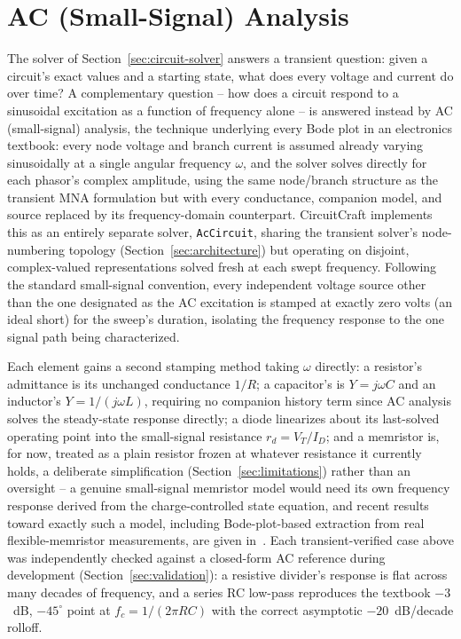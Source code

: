 \section{AC (Small-Signal) Analysis}
\label{sec:ac-analysis}

The solver of Section~\ref{sec:circuit-solver} answers a transient question: given a
circuit's exact values and a starting state, what does every voltage and current do over
time? A complementary question -- how does a circuit respond to a sinusoidal excitation as a
function of frequency alone -- is answered instead by AC (small-signal) analysis, the
technique underlying every Bode plot in an electronics textbook: every node voltage and
branch current is assumed already varying sinusoidally at a single angular frequency
$\omega$, and the solver solves directly for each phasor's complex amplitude, using the same
node/branch structure as the transient MNA formulation but with every conductance,
companion model, and source replaced by its frequency-domain counterpart. CircuitCraft
implements this as an entirely separate solver, \texttt{AcCircuit}, sharing the transient
solver's node-numbering topology (Section~\ref{sec:architecture}) but operating on disjoint,
complex-valued representations solved fresh at each swept frequency. Following the standard
small-signal convention, every independent voltage source other than the one designated as
the AC excitation is stamped at exactly zero volts (an ideal short) for the sweep's duration,
isolating the frequency response to the one signal path being characterized.

Each element gains a second stamping method taking $\omega$ directly: a resistor's admittance
is its unchanged conductance $1/R$; a capacitor's is $Y=j\omega C$ and an inductor's
$Y=1/(j\omega L)$, requiring no companion history term since AC analysis solves the
steady-state response directly; a diode linearizes about its last-solved operating point into
the small-signal resistance $r_d=V_T/I_D$; and a memristor is, for now, treated as a plain
resistor frozen at whatever resistance it currently holds, a deliberate simplification
(Section~\ref{sec:limitations}) rather than an oversight -- a genuine small-signal memristor
model would need its own frequency response derived from the charge-controlled state
equation, and recent results toward exactly such a model, including Bode-plot-based
extraction from real flexible-memristor measurements, are given
in~\cite{gater2026smallsignal,gater2025bodeplots}. Each transient-verified case above was
independently checked against a closed-form AC reference during development
(Section~\ref{sec:validation}): a resistive divider's response is flat across many decades of
frequency, and a series RC low-pass reproduces the textbook $-3$~dB, $-45^\circ$ point at
$f_c=1/(2\pi RC)$ with the correct asymptotic $-20$~dB/decade rolloff.

